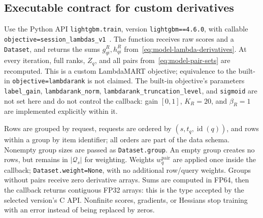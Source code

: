 \documentclass[12pt,a4paper]{article}
\newcommand{\code}[1]{{\ttfamily\small\nolinkurl{#1}}}
\theoremstyle{plainru}
\begin{document}
\subsection{Executable contract for custom derivatives}
\label{sec:model-ranker-implementation}

Use the Python API \code{lightgbm.train}, version
\code{lightgbm==4.6.0}, with callable
\code{objective=session\_lambdas\_v1}~\cite{lightgbm}.
The function receives raw scores and a \code{Dataset}, and returns
the sums $g_{qi}^R,h_{qi}^R$ from~\eqref{eq:model-lambda-derivatives}.
At every iteration, full ranks, $Z_q$,
and all pairs from~\eqref{eq:model-pair-sets} are recomputed.
This is a custom LambdaMART objective; equivalence to the built-in
\code{objective=lambdarank} is not claimed. The built-in objective's parameters
\code{label\_gain}, \code{lambdarank\_norm},
\code{lambdarank\_truncation\_level}, and \code{sigmoid}
are not set here and do not control the callback:
gain $[0,1]$, $K_R=20$, and $\beta_R=1$ are implemented explicitly within it.

Rows are grouped by request, requests are ordered by
$(s,t_q,\operatorname{id}(q))$, and rows within a group by item
identifier; all orders are part of the data schema. Nonempty group sizes
are passed as \code{Dataset.group}. An empty group creates no rows,
but remains in $|\mathcal Q_s|$ for weighting. Weights
$w_q^{\mathrm{pair}}$ are applied once inside the callback;
\code{Dataset.weight=None}, with no additional row/query weights.
Groups without pairs receive zero derivative arrays.
Sums are computed in FP64, then the callback returns contiguous
FP32 arrays: this is the type accepted by the selected version's C API. Nonfinite
scores, gradients, or Hessians stop training with an error
instead of being replaced by zeros.
\end{document}
